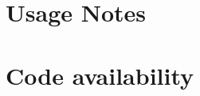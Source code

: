 \documentclass[fleqn,10pt]{wlscirep}
\begin{document}
\section*{Usage Notes}



\section*{Code availability}




\end{document}
